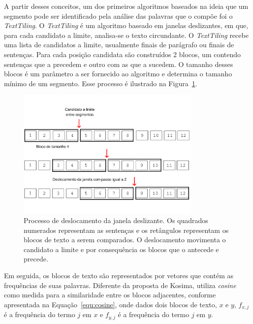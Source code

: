 


A partir desses conceitos, um dos primeiros algoritmos baseados na ideia que um segmento pode ser identificado pela análise das palavras que o compõe foi o \textit{TextTiling}. O \textit{TextTiling} é um algoritmo baseado em janelas deslizantes, em  que, para cada candidato a limite, analisa-se o texto circundante.  O \textit{TextTiling} recebe uma lista de candidatos a limite, usualmente finais de parágrafo ou finais de sentenças. Para cada posição candidata são construídos 2 blocos, um contendo sentenças que a precedem e outro com as que a sucedem. O tamanho desses blocos é um parâmetro a ser fornecido ao algoritmo e determina o tamanho mínimo de um segmento. Esse processo é ilustrado na Figura~\ref{fig:TT-slidingwindow}.


\begin{figure}[h!]
\center
	\includegraphics[trim={ 0 60 0 66 },clip,page=1,width=0.8\textwidth]{conteudo/capitulos/figs/janelas-deslizantes.pdf}

	\caption{Processo de deslocamento da janela deslizante. Os quadrados numerados representam as sentenças e os retângulos representam os blocos de texto a serem comparados. O deslocamento movimenta o candidato a limite e por consequência os blocos que o antecede e precede.}
	\label{fig:TT-slidingwindow}
\end{figure}


Em seguida, os blocos de texto são representados por vetores que contém as frequências de suas palavras.  Diferente da proposta de Kosima, utiliza \textit{cosine} como medida para a similaridade entre os blocos adjacentes, conforme apresentada na Equação~\ref{equ:cosine}, onde dados dois blocos de texto, $x$ e $y$, $f_{x,j}$ é a frequência do termo $j$ em $x$ e $f_{y,j}$ é a frequência do termo $j$ em $y$.

